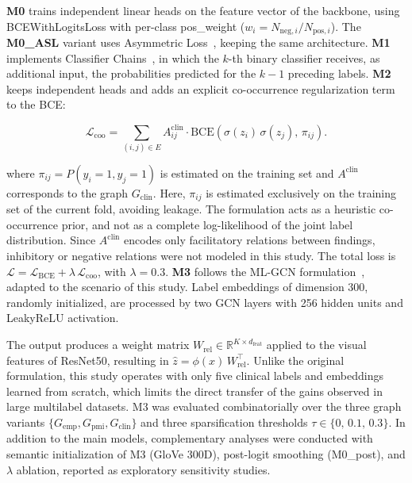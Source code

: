 \documentclass[12pt]{article}
\begin{document}

\textbf{M0} trains independent linear heads on the feature vector of the backbone, using BCEWithLogitsLoss with per-class pos\_weight ($w_i = N_{\text{neg},i}/N_{\text{pos},i}$). The \textbf{M0\_ASL} variant uses Asymmetric Loss~\cite{Ridnik2021}, keeping the same architecture. \textbf{M1} implements Classifier Chains~\cite{Read2011}, in which the $k$-th binary classifier receives, as additional input, the probabilities predicted for the $k-1$ preceding labels. \textbf{M2} keeps independent heads and adds an explicit co-occurrence regularization term to the BCE:

\begin{equation}
\mathcal{L}_{\text{coo}} = \sum_{(i,j) \in E} A_{ij}^{\text{clin}} \cdot \text{BCE}\!\left(\sigma(z_i)\,\sigma(z_j),\, \pi_{ij}\right).
\end{equation}

where $\pi_{ij} = P(y_i=1, y_j=1)$ is estimated on the training set and $A^{\text{clin}}$ corresponds to the graph $G_{\text{clin}}$. Here, $\pi_{ij}$ is estimated exclusively on the training set of the current fold, avoiding leakage. The formulation acts as a heuristic co-occurrence prior, and not as a complete log-likelihood of the joint label distribution. Since $A^{\text{clin}}$ encodes only facilitatory relations between findings, inhibitory or negative relations were not modeled in this study. The total loss is $\mathcal{L} = \mathcal{L}_{\text{BCE}} + \lambda\,\mathcal{L}_{\text{coo}}$, with $\lambda = 0.3$. \textbf{M3} follows the ML-GCN formulation~\cite{Chen2019}, adapted to the scenario of this study. Label embeddings of dimension 300, randomly initialized, are processed by two GCN layers with 256 hidden units and LeakyReLU activation.

The output produces a weight matrix $W_{\text{rel}} \in \mathbb{R}^{K\times d_{\text{feat}}}$ applied to the visual features of ResNet50, resulting in $\hat{z} = \phi(x)\,W_{\text{rel}}^{\top}$. Unlike the original formulation, this study operates with only five clinical labels and embeddings learned from scratch, which limits the direct transfer of the gains observed in large multilabel datasets. M3 was evaluated combinatorially over the three graph variants $\{G_{\text{emp}}, G_{\text{pmi}}, G_{\text{clin}}\}$ and three sparsification thresholds $\tau \in \{0,\,0.1,\,0.3\}$. In addition to the main models, complementary analyses were conducted with semantic initialization of M3 (GloVe 300D), post-logit smoothing (M0\_post), and $\lambda$ ablation, reported as exploratory sensitivity studies.
\end{document}
